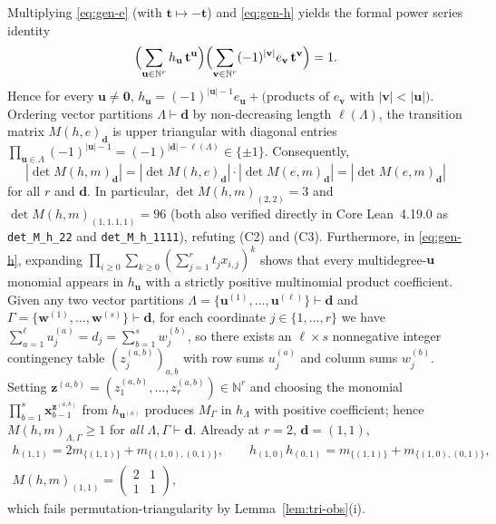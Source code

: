 \documentclass[11pt,a4paper]{article}
\theoremstyle{definition}
\theoremstyle{remark}
\newcommand{\NN}{\mathbb{N}}
\newcommand{\vecd}{\mathbf{d}}
\newcommand{\vecu}{\mathbf{u}}
\newcommand{\vecv}{\mathbf{v}}
\newcommand{\vecw}{\mathbf{w}}
\newcommand{\vecz}{\mathbf{z}}
\newcommand{\vecx}{\mathbf{x}}
\newcommand{\vect}{\mathbf{t}}
\begin{document}
Multiplying \eqref{eq:gen-e} (with $\vect \mapsto -\vect$) and \eqref{eq:gen-h} yields the formal power series identity
\[
  \Bigl(\sum_{\vecu \in \NN^r} h_{\vecu}\, \vect^{\vecu}\Bigr)
  \Bigl(\sum_{\vecv \in \NN^r} (-1)^{|\vecv|} e_{\vecv}\, \vect^{\vecv}\Bigr) = 1.
\]
Hence for every $\vecu \neq \mathbf{0}$, $h_{\vecu} = (-1)^{|\vecu|-1} e_{\vecu} + \text{(products of $e_{\vecv}$ with $|\vecv| < |\vecu|$)}$. Ordering vector partitions $\Lambda \vdash \vecd$ by non-decreasing length $\ell(\Lambda)$, the transition matrix $M(h,e)_{\vecd}$ is upper triangular with diagonal entries $\prod_{\vecu \in \Lambda} (-1)^{|\vecu|-1} = (-1)^{|\vecd| - \ell(\Lambda)} \in \{\pm 1\}$. Consequently,
\[
  |\det M(h,m)_{\vecd}| = |\det M(h,e)_{\vecd}| \cdot |\det M(e,m)_{\vecd}| = |\det M(e,m)_{\vecd}|
\]
for all $r$ and $\vecd$. In particular, $\det M(h,m)_{(2,2)} = 3$ and $\det M(h,m)_{(1,1,1,1)} = 96$ (both also verified directly in Core Lean~4.19.0 as \texttt{det\_M\_h\_22} and \texttt{det\_M\_h\_1111}), refuting (C2) and (C3). Furthermore, in \eqref{eq:gen-h}, expanding $\prod_{i \ge 0} \sum_{k \ge 0} (\sum_{j=1}^r t_j x_{i,j})^k$ shows that every multidegree-$\vecu$ monomial appears in $h_{\vecu}$ with a strictly positive multinomial product coefficient. Given any two vector partitions $\Lambda = \{\vecu^{(1)}, \dots, \vecu^{(\ell)}\} \vdash \vecd$ and $\Gamma = \{\vecw^{(1)}, \dots, \vecw^{(s)}\} \vdash \vecd$, for each coordinate $j \in \{1,\dots,r\}$ we have $\sum_{a=1}^\ell u^{(a)}_j = d_j = \sum_{b=1}^s w^{(b)}_j$, so there exists an $\ell \times s$ nonnegative integer contingency table $(z^{(a,b)}_j)_{a,b}$ with row sums $u^{(a)}_j$ and column sums $w^{(b)}_j$. Setting $\vecz^{(a,b)} = (z^{(a,b)}_1, \dots, z^{(a,b)}_r) \in \NN^r$ and choosing the monomial $\prod_{b=1}^s \vecx_{b-1}^{\vecz^{(a,b)}}$ from $h_{\vecu^{(a)}}$ produces $M_\Gamma$ in $h_\Lambda$ with positive coefficient; hence $M(h,m)_{\Lambda,\Gamma} \ge 1$ for \emph{all} $\Lambda, \Gamma \vdash \vecd$. Already at $r = 2$, $\vecd = (1,1)$,
\begin{gather*}
  h_{(1,1)} = 2 m_{\{(1,1)\}} + m_{\{(1,0),(0,1)\}}, \qquad
  h_{(1,0)} h_{(0,1)} = m_{\{(1,1)\}} + m_{\{(1,0),(0,1)\}}, \\
  M(h,m)_{(1,1)} = \begin{pmatrix} 2 & 1 \\ 1 & 1 \end{pmatrix},
\end{gather*}
which fails permutation-triangularity by Lemma~\ref{lem:tri-obs}(i).
\end{document}
